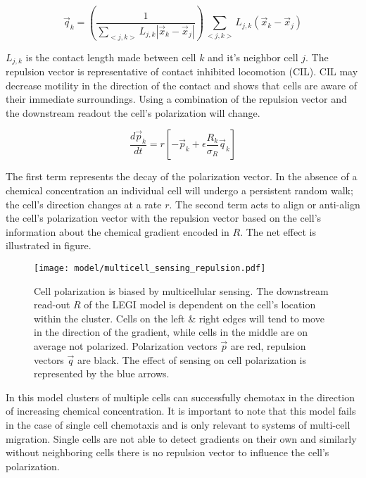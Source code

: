 \documentclass[a4paper]{article}
\begin{document}
\begin{equation}
    \vec{q}_k = \left( \frac{1}{\sum_{<j,k>} L_{j,k}|\vec{x}_k - \vec{x}_j|} \right)
    \sum_{<j,k>} L_{j,k} \left( \vec{x}_k - \vec{x}_j \right)
\end{equation}

$L_{j,k}$ is the contact length made between cell $k$ and it's neighbor cell $j$. The repulsion vector is representative of contact inhibited locomotion (CIL). CIL may decrease motility in the direction of the contact and shows that cells are aware of their immediate surroundings. Using a combination of the repulsion vector and the downstream readout the cell's polarization will change.

\begin{equation} \label{eq:polarVec}
    \frac{d\vec{p}_k}{dt} = r \left[ -\vec{p}_k + \epsilon \frac{R_k}{\sigma_R} \vec{q}_k \right]
\end{equation}

The first term represents the decay of the polarization vector. In the absence of a chemical concentration an individual cell will undergo a persistent random walk; the cell's direction changes at a rate $r$. The second term acts to align or anti-align the cell’s polarization vector with the repulsion vector based on the cell's information about the chemical gradient encoded in $R$. The net effect is illustrated in figure.

\begin{figure}
    \centering
        \texttt{[image: model/multicell\_sensing\_repulsion.pdf]}
    \caption{Cell polarization is biased by multicellular sensing. The downstream read-out $R$ of the LEGI model is dependent on the cell's location within the cluster. Cells on the left \& right edges will tend to move in the direction of the gradient, while cells in the middle are on average not polarized. Polarization vectors $\vec{p}$ are red, repulsion vectors $\vec{q}$ are black. The effect of sensing on cell polarization is represented by the blue arrows.} \label{fig:cellPolar}
\end{figure}

In this model clusters of multiple cells can successfully chemotax in the direction of increasing chemical concentration. It is important to note that this model fails in the case of single cell chemotaxis and is only relevant to systems of multi-cell migration. Single cells are not able to detect gradients on their own and similarly without neighboring cells there is no repulsion vector to influence the cell's polarization.
\end{document}
